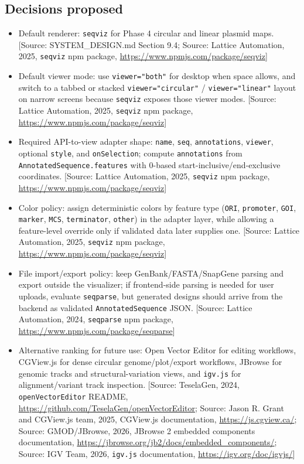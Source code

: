\documentclass[11pt]{report}
\begin{document}
\subsection{Decisions proposed}
\begin{itemize}
\item Default renderer: \texttt{seqviz} for Phase 4 circular and linear plasmid maps. [Source: SYSTEM\_DESIGN.md Section 9.4; Source: Lattice Automation, 2025, \texttt{seqviz} npm package, \url{https://www.npmjs.com/package/seqviz}]
\item Default viewer mode: use \texttt{viewer="both"} for desktop when space allows, and switch to a tabbed or stacked \texttt{viewer="circular"} / \texttt{viewer="linear"} layout on narrow screens because \texttt{seqviz} exposes those viewer modes. [Source: Lattice Automation, 2025, \texttt{seqviz} npm package, \url{https://www.npmjs.com/package/seqviz}]
\item Required API-to-view adapter shape: \texttt{name}, \texttt{seq}, \texttt{annotations}, \texttt{viewer}, optional \texttt{style}, and \texttt{onSelection}; compute \texttt{annotations} from \texttt{AnnotatedSequence.features} with 0-based start-inclusive/end-exclusive coordinates. [Source: Lattice Automation, 2025, \texttt{seqviz} npm package, \url{https://www.npmjs.com/package/seqviz}]
\item Color policy: assign deterministic colors by feature type (\texttt{ORI}, \texttt{promoter}, \texttt{GOI}, \texttt{marker}, \texttt{MCS}, \texttt{terminator}, \texttt{other}) in the adapter layer, while allowing a feature-level override only if validated data later supplies one. [Source: Lattice Automation, 2025, \texttt{seqviz} npm package, \url{https://www.npmjs.com/package/seqviz}]
\item File import/export policy: keep GenBank/FASTA/SnapGene parsing and export outside the visualizer; if frontend-side parsing is needed for user uploads, evaluate \texttt{seqparse}, but generated designs should arrive from the backend as validated \texttt{AnnotatedSequence} JSON. [Source: Lattice Automation, 2024, \texttt{seqparse} npm package, \url{https://www.npmjs.com/package/seqparse}]
\item Alternative ranking for future use: Open Vector Editor for editing workflows, CGView.js for dense circular genome/plot/export workflows, JBrowse for genomic tracks and structural-variation views, and \texttt{igv.js} for alignment/variant track inspection. [Source: TeselaGen, 2024, \texttt{openVectorEditor} README, \url{https://github.com/TeselaGen/openVectorEditor}; Source: Jason R. Grant and CGView.js team, 2025, CGView.js documentation, \url{https://js.cgview.ca/}; Source: GMOD/JBrowse, 2026, JBrowse 2 embedded components documentation, \url{https://jbrowse.org/jb2/docs/embedded_components/}; Source: IGV Team, 2026, \texttt{igv.js} documentation, \url{https://igv.org/doc/igvjs/}]
\end{itemize}
\end{document}
